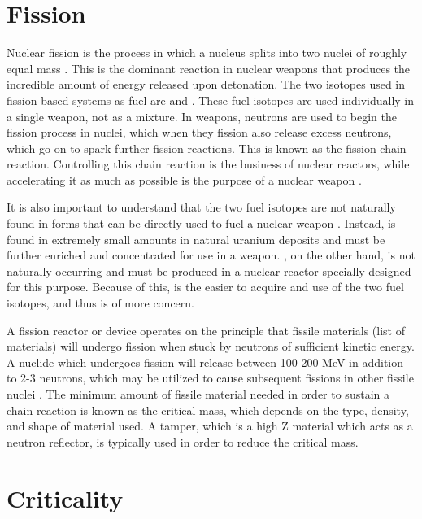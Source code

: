 \documentclass{report}
\begin{document}
\section{Fission}

Nuclear fission is the process in which a nucleus splits into two nuclei of roughly equal mass \cite{krane1987introductory,Lamarsh2013}. This is the dominant reaction in nuclear weapons that produces the incredible amount of energy released upon detonation. The two isotopes used in fission-based systems as fuel are  and . These fuel isotopes are used individually in a single weapon, not as a mixture. In weapons, neutrons are used to begin the fission process in nuclei, which when they fission also release excess neutrons, which go on to spark further fission reactions. This is known as the fission chain reaction. Controlling this chain reaction is the business of nuclear reactors, while accelerating it as much as possible is the purpose of a nuclear weapon \cite{Duderstadt1976}. 

It is also important to understand that the two fuel isotopes are not naturally found in forms that can be directly used to fuel a nuclear weapon \cite{Benedict1981,Lewis2008}. Instead,  is found in extremely small amounts in natural uranium deposits and must be further enriched and concentrated for use in a weapon. , on the other hand, is not naturally occurring and must be produced in a nuclear reactor specially designed for this purpose. Because of this,  is the easier to acquire and use of the two fuel isotopes, and thus is of more concern. 




A fission reactor or device operates on the principle that fissile materials (list of materials) will undergo fission when stuck by neutrons of sufficient kinetic energy. A nuclide which undergoes fission will release between 100-200 MeV in addition to 2-3 neutrons, which may be utilized to cause subsequent fissions in other fissile nuclei \cite{krane1987introductory}. The minimum amount of fissile material needed in order to sustain a chain reaction is known as the critical mass, which depends on the type, density, and shape of material used. A tamper, which is a high Z material which acts as a neutron reflector, is typically used in order to reduce the critical mass. 

\section{Criticality}
\end{document}
